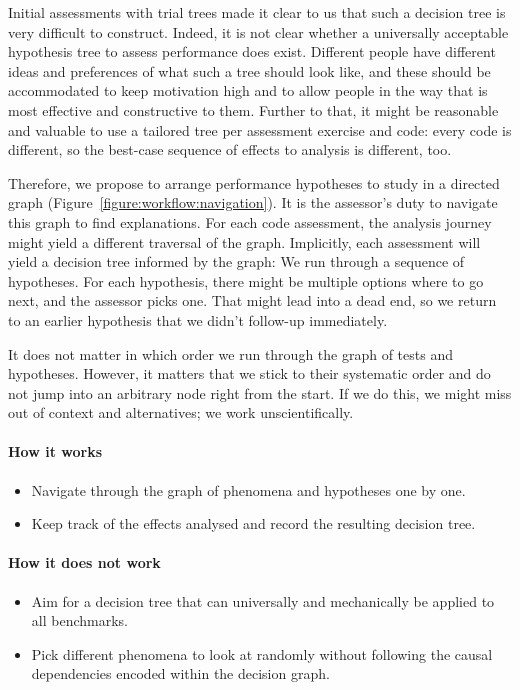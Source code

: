 Initial assessments with trial trees made it clear to us that such a decision tree is very difficult to construct.
Indeed, it is not clear whether a universally acceptable hypothesis tree to assess performance does exist. 
Different people have different ideas and preferences of what such a tree should look like, and these should be accommodated to keep motivation high and to allow people in the way that is most effective and constructive to them.
Further to that, it might be reasonable and valuable to use a tailored tree per assessment exercise and code:
every code is different, so the best-case sequence of effects to analysis is different, too. 

Therefore, we propose to arrange performance hypotheses to study in a directed graph (Figure~\ref{figure:workflow:navigation}).
It is the assessor's duty to navigate this graph to find explanations.
For each code assessment, the analysis journey might yield a different traversal of the graph.
Implicitly, each assessment will yield a decision tree informed by the graph:
We run through a sequence of hypotheses.
For each hypothesis, there might be multiple options where to go next, and the assessor picks one.
That might lead into a dead end, so we return to an earlier hypothesis that we didn't follow-up immediately.


It does not matter in which order we run through the graph of tests and hypotheses.
However, it matters that we stick to their systematic order and do not jump into an arbitrary node right from the start.
If we do this, we might miss out of context and alternatives; we work unscientifically.



\paragraph*{How it works}

\begin{itemize}[noitemsep]
  \item[$\boxplus$] Navigate through the graph of phenomena and hypotheses one by one.
  \item[$\boxplus$] Keep track of the effects analysed and record the resulting decision tree.
\end{itemize}


\paragraph*{How it does not work}

\begin{itemize}[noitemsep]
  \item[$\boxminus$] Aim for a decision tree that can universally and mechanically be applied to all benchmarks.
  \item[$\boxminus$] Pick different phenomena to look at randomly without following the causal dependencies encoded within the decision graph.
\end{itemize}
